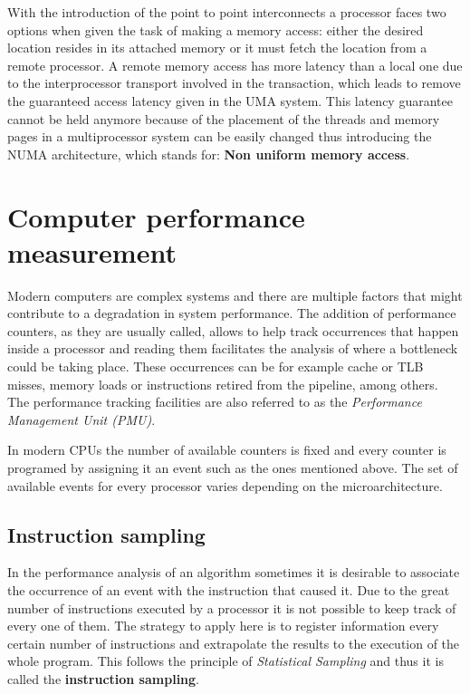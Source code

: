 With the introduction of the point to point interconnects a processor faces two options when given the task of making a memory access: either the desired location resides in its attached memory or it must fetch the location from a remote processor. A remote memory access has more latency than a local one due to the interprocessor transport involved in the transaction, which leads to remove the guaranteed access latency given in the UMA system. This latency guarantee cannot be held anymore because of the placement of the threads and memory pages in a multiprocessor system can be easily changed thus introducing the NUMA architecture, which stands for: \textbf{Non uniform memory access}. 

\section{Computer performance measurement}\label{section:perfmeas}

Modern computers are complex systems and there are multiple factors that might contribute to a degradation in system performance. The addition of performance counters, as they are usually called, allows to help track occurrences that happen inside a processor and reading them facilitates the analysis of where a bottleneck could be taking place. These occurrences can be for example cache or TLB misses, memory loads or instructions retired from the pipeline, among others. The performance tracking facilities are also referred to as the \textit{Performance Management Unit (PMU)}.

In modern CPUs the number of available counters is fixed and every counter is programed by assigning it an event such as the ones mentioned above. The set of available events for every processor varies depending on the microarchitecture. 

\subsection{Instruction sampling}\label{subsection:sampling}
In the performance analysis of an algorithm sometimes it is desirable to associate the occurrence of an event with the instruction that caused it. Due to the great number of instructions executed by a processor it is not possible to keep track of every one of them. The strategy to apply here is to register information every certain number of instructions and extrapolate the results to the execution of the whole program. This follows the principle of \textit{Statistical Sampling} and thus it is called the \textbf{instruction sampling}.

